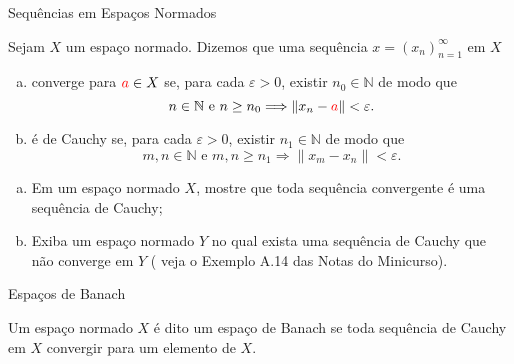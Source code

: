 \begin{frame}{Sequências em Espaços Normados}
\begin{defin}
 Sejam $X$ um espaço normado. Dizemos que uma sequência  $x=(x_n)_{n=1}^{\infty}$  em $X$
\begin{enumerate}[(a)]
    \item {\color{blue} converge} para ${\color{red}a}\in X$ se, para cada $\varepsilon >0$, existir $n_0 \in \mathbb N$ de modo que
    \begin{equation*}
    n\in \mathbb N \text{ e } n\geq n_0 \Longrightarrow \|x_n-{\color{red}a}\|< \varepsilon .
\end{equation*}
\item é {\color{blue} de Cauchy} se, para cada $\varepsilon >0$, existir $n_1 \in \mathbb N$ de modo que
\begin{equation*}
    m,n\in \mathbb N \text{ e } m,n\geq n_1 \Longrightarrow \|x_m-x_n\|< \varepsilon .
\end{equation*}
\end{enumerate}
\end{defin}
\end{frame}
\begin{frame}
\begin{exer}
    \begin{enumerate}[(a)]
        \item Em um espaço normado $X$, mostre que toda sequência convergente é uma sequência de Cauchy;
        \item Exiba um espaço normado $Y$ no qual exista uma  sequência de Cauchy que não converge em $Y$ ({\color{red} veja o Exemplo A.14 das Notas do Minicurso}).
    \end{enumerate}
\end{exer}
\end{frame}
\begin{frame}{Espaços de Banach}
\begin{defin}
    Um espaço normado $X$ é dito um {\color{blue} espaço de Banach} se toda sequência de Cauchy em $X$ convergir para um elemento de $X$.
\end{defin}
\end{frame}
